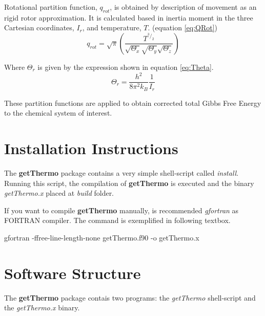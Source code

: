 \documentclass[11pt,oneside,a4paper]{article}
\begin{document}
Rotational partition function, $q_{rot}$, is obtained by description of movement as an rigid rotor approximation. It is calculated based in inertia moment in the three Cartesian coordinates, $I_{r}$, and temperature, $T$. (equation \ref{eq:QRot})
\begin{equation}\label{eq:QRot}
q_{rot} = \sqrt{\pi} \left( \frac{T^{^3/_2}}{\sqrt{\Theta_{x}}\sqrt{\Theta_{y	}}\sqrt{\Theta_{z}}} \right)
\end{equation}

Where $\Theta_{r}$ is given by the expression shown in equation \ref{eq:Theta}.
\begin{equation}\label{eq:Theta}
\Theta_{r} = \frac{h^{2}}{8\pi^{2}k_{B}} \frac{1}{I_{r}}
\end{equation}

These partition functions are applied to obtain corrected total Gibbs Free Energy to the chemical system of interest.

\pagebreak
\section[Installation Instructions]{Installation Instructions}

The \textbf{getThermo} package contains a very simple shell-script called \textit{install}. Running this script, the compilation of \textbf{getThermo} is executed and the binary \textit{getThermo.x} placed at \textit{build} folder.

If you want to compile \textbf{getThermo} manually, is recommended \textit{gfortran} as FORTRAN compiler. The command is exemplified in following textbox.
\begin{shaded}
gfortran -ffree-line-length-none getThermo.f90 -o getThermo.x
\end{shaded}

\section[Software Structure]{Software Structure}

The \textbf{getThermo} package contais two programs: the \textit{getThermo} shell-script and the \textit{getThermo.x} binary. 
\end{document}
